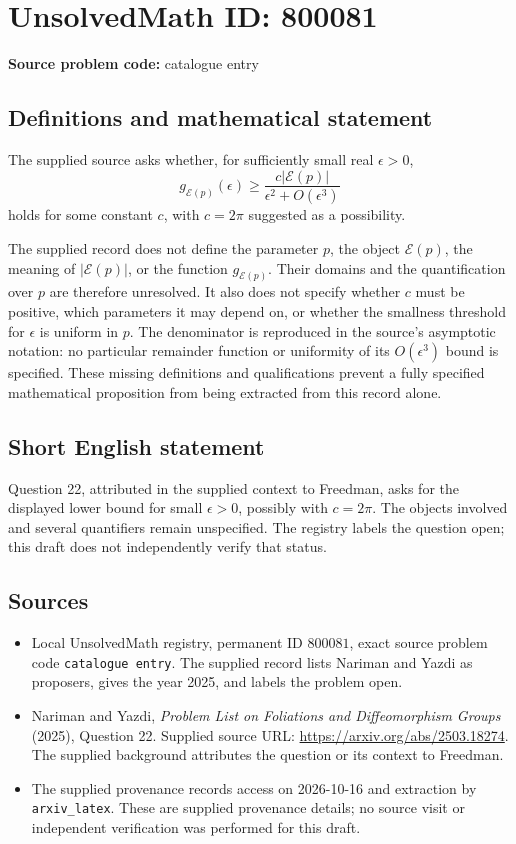 \documentclass[11pt]{article}
\begin{document}
\section*{UnsolvedMath ID: 800081}
\textbf{Source problem code:} catalogue entry
\subsection{Definitions and mathematical statement}
The supplied source asks whether, for sufficiently small real $\epsilon>0$,
\[
g_{\mathscr{E}(p)}(\epsilon)\geq
\frac{c\lvert\mathscr{E}(p)\rvert}{\epsilon^2+O(\epsilon^3)}
\]
holds for some constant $c$, with $c=2\pi$ suggested as a possibility.

The supplied record does not define the parameter $p$, the object $\mathscr{E}(p)$, the meaning of $\lvert\mathscr{E}(p)\rvert$, or the function $g_{\mathscr{E}(p)}$. Their domains and the quantification over $p$ are therefore unresolved. It also does not specify whether $c$ must be positive, which parameters it may depend on, or whether the smallness threshold for $\epsilon$ is uniform in $p$. The denominator is reproduced in the source's asymptotic notation: no particular remainder function or uniformity of its $O(\epsilon^3)$ bound is specified. These missing definitions and qualifications prevent a fully specified mathematical proposition from being extracted from this record alone.
\subsection{Short English statement}
Question 22, attributed in the supplied context to Freedman, asks for the displayed lower bound for small $\epsilon>0$, possibly with $c=2\pi$. The objects involved and several quantifiers remain unspecified. The registry labels the question open; this draft does not independently verify that status.
\subsection{Sources}
\begin{itemize}
\item Local UnsolvedMath registry, permanent ID $800081$, exact source problem code \texttt{catalogue entry}. The supplied record lists Nariman and Yazdi as proposers, gives the year 2025, and labels the problem open.
\item Nariman and Yazdi, \emph{Problem List on Foliations and Diffeomorphism Groups} (2025), Question 22. Supplied source URL: \url{https://arxiv.org/abs/2503.18274}. The supplied background attributes the question or its context to Freedman.
\item The supplied provenance records access on 2026-10-16 and extraction by \texttt{arxiv\_latex}. These are supplied provenance details; no source visit or independent verification was performed for this draft.
\end{itemize}
\end{document}
